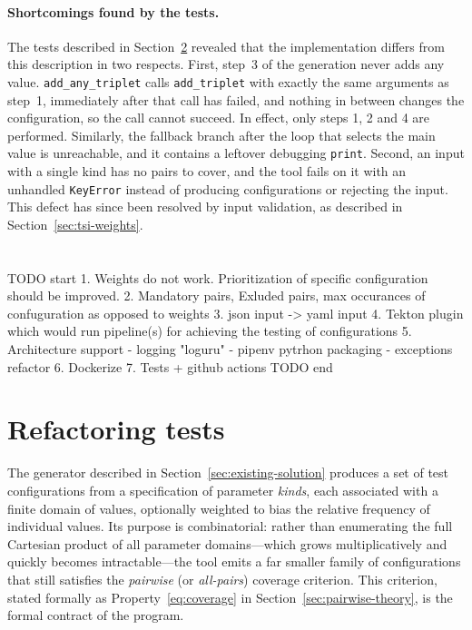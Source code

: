 \documentclass[
  digital, %
  oneside, %
  lof,     %
  nolot,     %
]{fithesis4}
\begin{document}
\paragraph{Shortcomings found by the tests.} The tests described in
Section~\ref{sec:test-suite-improvements} revealed that the implementation
differs from this description in two respects. First, step~3 of the
generation never adds any value. \texttt{add\_any\_triplet} calls
\texttt{add\_triplet} with exactly the same arguments as step~1, immediately
after that call has failed, and nothing in between changes the configuration,
so the call cannot succeed. In effect, only steps 1, 2 and 4 are performed.
Similarly, the fallback branch after the loop that selects the main value is
unreachable, and it contains a leftover debugging \texttt{print}. Second, an
input with a single kind has no pairs to cover, and the tool fails on it with an
unhandled \texttt{KeyError} instead of producing configurations or rejecting
the input. This defect has since been resolved by input validation, as described
in Section~\ref{sec:tsi-weights}.

\section{}
TODO start
1. Weights do not work. Prioritization of specific configuration should be improved.
2. Mandatory pairs, Exluded pairs, max occurances of confuguration as opposed to weights
3. json input -> yaml input
4. Tekton plugin which would run pipeline(s) for achieving the testing of configurations
5. Architecture support
    - logging "loguru"
    - pipenv pytrhon packaging
    - exceptions refactor
6. Dockerize
7. Tests + github actions
TODO end
\section{Refactoring tests}
\label{sec:test-suite-improvements}
The generator described in Section~\ref{sec:existing-solution} produces a set
of test configurations from a specification of parameter \emph{kinds}, each
associated with a finite domain of values, optionally weighted to bias the relative frequency of individual values.
Its purpose is combinatorial: rather than enumerating the full Cartesian product
of all parameter domains---which grows multiplicatively and quickly becomes
intractable---the tool emits a far smaller family of configurations that still
satisfies the \emph{pairwise} (or \emph{all-pairs}) coverage criterion. This
criterion, stated formally as Property~\eqref{eq:coverage} in
Section~\ref{sec:pairwise-theory}, is the formal contract of the program.
\end{document}
